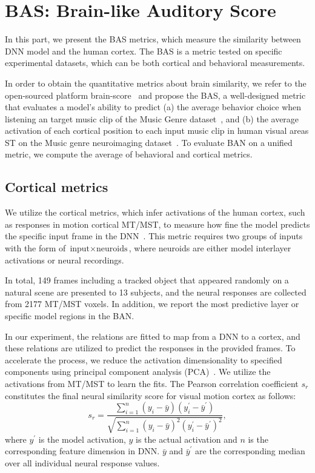 \documentclass[journal]{IEEEtran}
\begin{document}
\section{BAS: Brain-like Auditory Score} \label{sec:bas}
In this part, we present the BAS metrics, which measure the similarity between DNN model and the human cortex. 
The BAS is a metric tested on specific experimental datasets, which can be both cortical and behavioral measurements. 

In order to obtain the quantitative metrics about brain similarity, we refer to the open-sourced platform brain-score~\cite{SchrimpfKubilius2018BrainScore} and propose the BAS, a well-designed metric that evaluates a model's ability to predict 
(a) the average behavior choice when listening an target music clip of the Music Genre dataset~\cite{nakai2022music}, 
and (b) the average activation of each cortical position to each input music clip in human visual areas ST on the Music genre neuroimaging dataset~\cite{nakai2022music}.
To evaluate BAN on a unified metric, we compute the average of behavioral and cortical metrics.


\subsection{Cortical metrics}
\label{sec:neural-pred}

We utilize the cortical metrics, which infer activations of the human cortex, such as responses in motion cortical MT/MST, to measure how fine the model predicts the specific input frame in the DNN~\cite{yamins2014performance}. 
This metric requires two groups of inputs with the form of $\text{input} \times \text{neuroids}$, where neuroids are either model interlayer activations or neural recordings. 

In total, 149 frames including a tracked object that appeared randomly on a natural scene are presented to 13 subjects,
and the neural responses are collected from 2177 MT/MST voxels. 
In addition, we report the most predictive layer or specific model regions in the BAN. 

In our experiment, the relations are fitted to map from a DNN to a cortex, and these relations are utilized to predict the responses in the provided frames. 
To accelerate the process, we reduce the activation dimensionality to specified components using principal component analysis (PCA)~\cite{2002Principal}. 
We utilize the activations from MT/MST to learn the fits. 
The Pearson correlation coefficient $s_r$ constitutes the final neural similarity score for visual motion cortex as follows:
\begin{equation}
	s_r=\frac{\sum_{i=1}^{n} (y_i-\bar{y}) (y_i^\prime - \bar{y}^\prime) }{\sqrt{\sum_{i=1}^{n} (y_i - \bar{y})^2 (y_i^\prime - \bar{y}^\prime)^2 }},
\end{equation}
where $y^\prime$ is the model activation, $y$ is the actual activation and $n$ is the corresponding feature dimension in DNN. $\bar{y}$ and $\bar{y}^\prime$ are the corresponding median over all individual neural response values.
\end{document}
